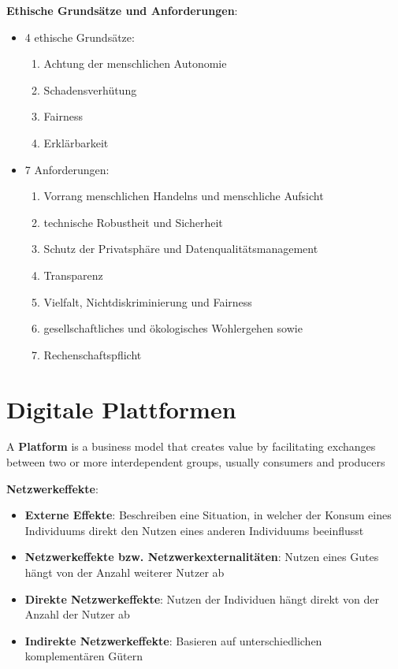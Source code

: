 \textbf{Ethische Grundsätze und Anforderungen}:
\begin{itemize}
	\item 4 ethische Grundsätze:
	\begin{enumerate}
		\item Achtung der menschlichen Autonomie
		\item Schadensverhütung
		\item Fairness
		\item Erklärbarkeit
	\end{enumerate}
	\item 7 Anforderungen:
	\begin{enumerate}
		\item Vorrang menschlichen Handelns und menschliche Aufsicht
		\item technische Robustheit und Sicherheit
		\item Schutz der Privatsphäre und Datenqualitätsmanagement
		\item Transparenz
		\item Vielfalt, Nichtdiskriminierung und Fairness
		\item gesellschaftliches und ökologisches Wohlergehen sowie
		\item Rechenschaftspflicht
	\end{enumerate}
\end{itemize}

\section{Digitale Plattformen}

A \textbf{Platform} is a business model that creates value by facilitating exchanges between two or more interdependent groups, usually consumers and producers

\textbf{Netzwerkeffekte}:
\begin{itemize}
	\item \textbf{Externe Effekte}: Beschreiben eine Situation, in welcher der Konsum eines Individuums direkt den Nutzen eines anderen Individuums beeinflusst
	\item \textbf{Netzwerkeffekte bzw. Netzwerkexternalitäten}: Nutzen eines Gutes hängt von der Anzahl weiterer Nutzer ab
	\item \textbf{Direkte Netzwerkeffekte}: Nutzen der Individuen hängt direkt von der Anzahl der Nutzer ab
	\item \textbf{Indirekte Netzwerkeffekte}: Basieren auf unterschiedlichen komplementären Gütern
\end{itemize}

